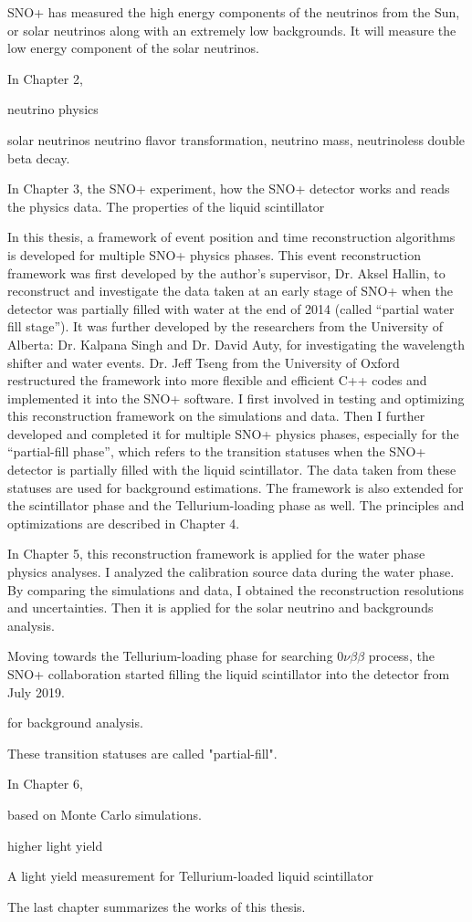 SNO+ has measured the high energy components of the neutrinos from the Sun, or solar neutrinos along with an extremely low backgrounds. It will measure the low energy component of the solar neutrinos.

In Chapter 2, 

neutrino physics

solar neutrinos
neutrino flavor transformation, neutrino mass, neutrinoless double beta decay.

In Chapter 3, the SNO+ experiment, how the SNO+ detector works and reads the physics data.
The properties of the liquid scintillator

In this thesis, a framework of event position and time reconstruction algorithms is developed for multiple SNO+ physics phases. This event reconstruction framework was first developed by the author's supervisor, Dr. Aksel Hallin, to reconstruct and investigate the data taken at an early stage of SNO+ when the detector was partially filled with water at the end of 2014 (called ``partial water fill stage'')\cite{partialWater}. It was further developed by the researchers from the University of Alberta: Dr. Kalpana Singh and Dr. David Auty, for investigating the wavelength shifter and water events\cite{davidPartialWater, kalpanaWLS, kalpanaWLS2, kalpanaMPFitter}. Dr. Jeff Tseng from the University of Oxford restructured the framework into more flexible and efficient C++ codes and implemented it into the SNO+ software\cite{jieMPW}. I first involved in testing and optimizing this reconstruction framework on the simulations and data. Then I further developed and completed it for multiple SNO+ physics phases, especially for the ``partial-fill phase'', which refers to the transition statuses when the SNO+ detector is partially filled with the liquid scintillator. The data taken from these statuses are used for background estimations. The framework is also extended for the scintillator phase and the Tellurium-loading phase as well. The principles and optimizations are described in Chapter 4.

In Chapter 5, this reconstruction framework is applied for the water phase physics analyses. I analyzed the calibration source data during the water phase. By comparing the simulations and data, I obtained the reconstruction resolutions and uncertainties. Then it is applied for the solar neutrino and backgrounds analysis.

Moving towards the Tellurium-loading phase for searching $0\nu\beta\beta$ process, the SNO+ collaboration started filling the liquid scintillator into the detector from July 2019. 

for background analysis.

These transition statuses are called "partial-fill".  

In Chapter 6, 

based on Monte Carlo simulations.

higher light yield

A light yield measurement for Tellurium-loaded liquid scintillator

The last chapter summarizes the works of this thesis.